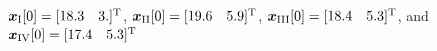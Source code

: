 ${\boldsymbol{x}_{\text{I}}[0]=[ \begin{matrix}
  18.3 & 3.\\
\end{matrix} ]^{\mathrm{T}}}$,
${\boldsymbol{x}_{\text{II}}[0]=[ \begin{matrix}
  19.6 & 5.9\\
\end{matrix} ]^{\mathrm{T}}}$,
${\boldsymbol{x}_{\text{III}}[0]=[ \begin{matrix}
  18.4 & 5.3\\
\end{matrix} ]^{\mathrm{T}}}$,
and
${\boldsymbol{x}_{\text{IV}}[0]=[ \begin{matrix}
  17.4 & 5.3\\
\end{matrix} ]^{\mathrm{T}}}$